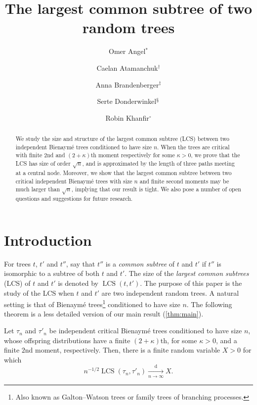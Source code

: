 \documentclass[11pt,reqno]{amsart}
\title{The largest common subtree of two random trees}
\author[O.~Angel]{Omer Angel$^*$}
\author[C.~Atamanchuk]{Caelan Atamanchuk$^\dagger$}
\author[A.~Brandenberger]{Anna Brandenberger$^\ddagger$}
\author[S.~Donderwinkel]{ Serte Donderwinkel$^\mathsection$}
\author[R.~Khanfir]{Robin Khanfir$^\circ$}
\newcommand{\1}{\mathbf{1}}
\newcommand{\0}{\mathbf{0}}
\newcommand{\LCS}{\operatorname{LCS}}
\begin{document}



\begin{abstract}
  We study the size and structure of the largest common subtree (LCS) between two independent Bienaym\'{e} trees conditioned to have size $n$.
  When the trees are critical with finite $2$nd and $(2+\kappa)$th moment respectively for some $\kappa>0$, we prove that the LCS has size of order $\sqrt{n}$, and is approximated by the length of three paths meeting at a central node. Moreover, we show that the largest common subtree between two critical independent Bienaymé trees with size $n$ and finite second moments may be much larger than $\sqrt{n}$, implying that our result is tight. We also pose a number of open questions and suggestions for future research.
\end{abstract}

\maketitle 


\section{Introduction}


For trees $t$, $t'$ and $t''$, say that $t''$ is a \emph{common subtree} of $t$ and $t'$ if $t''$ is isomorphic to a subtree of both $t$ and $t'$.
The size of the \emph{largest common subtrees} (LCS) of $t$ and $t'$ is denoted by $\LCS(t,t')$.
The purpose of this paper is the study of the LCS when $t$ and $t'$ are two independent random trees.
A natural setting is that of Bienaym\'e trees\footnote{Also known as Galton--Watson trees or family trees of branching processes.} conditioned to have size $n$.
The following theorem is a less detailed version of our main result (\cref{thm:main}).

\begin{thm}
  Let $\tau_n$ and $\tau'_n$ be independent critical Bienaymé trees conditioned to have size $n$, whose offspring distributions have a finite $(2+\kappa)$th, for some $\kappa>0$, and a finite $2$nd moment, respectively.
  Then, there is a finite random variable $X>0$ for which
  \[ n^{-1/2} \LCS(\tau_n,\tau'_n) \xrightarrow[n\to\infty]{\mathrm d} X. \] 
\end{thm}
\end{document}
